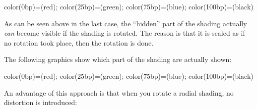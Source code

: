 \begin{command}{\pgfshadepath{}}
\begin{codeexample}[]
 {color(0bp)=(red); color(25bp)=(green);  color(75bp)=(blue);  color(100bp)=(black)}
\hskip 1cm
\begin{pgfpicture}
  \pgfpathrectangle{\pgfpointorigin}{\pgfpoint{2cm}{1cm}}
  \pgfpathrectangle{\pgfpoint{3cm}{0cm}}{\pgfpoint{1cm}{2cm}}
  \pgfpathrectangle{\pgfpoint{5cm}{0cm}}{\pgfpoint{2cm}{2cm}}
  \pgfpathcircle{\pgfpoint{9cm}{1cm}}{1cm}
\end{pgfpicture}
\end{codeexample}

  As can be seen above in the last case, the ``hidden'' part of the
  shading actually \emph{can} become visible if the shading is
  rotated. The reason is that it is scaled as if no rotation took
  place, then the rotation is done.

  The following graphics show which part of the shading are actually
  shown: 

\begin{codeexample}[]
 {color(0bp)=(red); color(25bp)=(green);  color(75bp)=(blue);  color(100bp)=(black)}
\end{codeexample}
  
  An advantage of this approach is that when you rotate a radial
  shading, no distortion is introduced:


\end{command}
